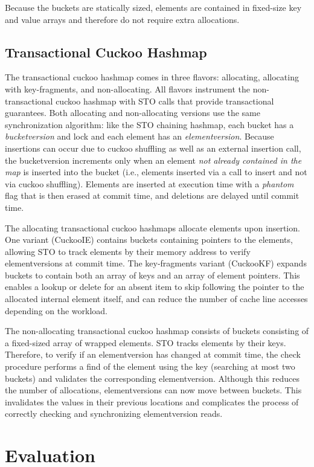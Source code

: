 Because the buckets are statically sized, elements are contained in fixed-size key and value arrays and therefore do not require extra allocations.

\subsection{Transactional Cuckoo Hashmap}
The transactional cuckoo hashmap comes in three flavors: allocating, allocating with key-fragments, and non-allocating. All flavors instrument the non-transactional cuckoo hashmap with STO calls that provide transactional guarantees.
Both allocating and non-allocating versions use the same synchronization algorithm: like the STO chaining hashmap, each bucket has a \emph{bucketversion} and lock and each element has an \emph{elementversion}. Because insertions can occur due to cuckoo shuffling as well as an external insertion call, the bucketversion increments only when an element \emph{not already contained in the map} is inserted into the bucket (i.e., elements inserted via a call to insert and not via cuckoo shuffling). Elements are inserted at execution time with a \emph{phantom} flag that is then erased at commit time, and deletions are delayed until commit time.

The allocating transactional cuckoo hashmaps allocate elements upon insertion. One variant (CuckooIE) contains buckets containing pointers to the elements, allowing STO to track elements by their memory address to verify elementversions at commit time. The key-fragments variant (CuckooKF) expands buckets to contain both an array of keys and an array of element pointers. This enables a lookup or delete for an absent item to skip following the pointer to the allocated internal element itself, and can reduce the number of cache line accesses depending on the workload.

The non-allocating transactional cuckoo hashmap consists of buckets consisting of a fixed-sized array of wrapped elements. STO tracks elements by their keys. Therefore, to verify if an elementversion has changed at commit time, the check procedure performs a find of the element using the key (searching at most two buckets) and validates the corresponding elementversion. Although this reduces the number of allocations, elementversions can now move between buckets. This invalidates the values in their previous locations and complicates the process of correctly checking and synchronizing elementversion reads.

\section{Evaluation}

